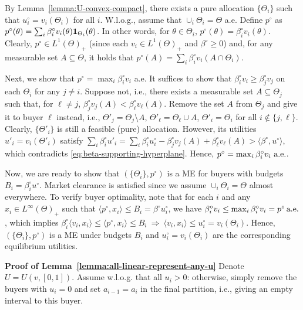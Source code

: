 	By Lemma~\ref{lemma:U-convex-compact}, there exists a pure allocation $\{\Theta_i\}$ such that $u^\circ_i = v_i(\Theta_i)$ for all $i$. W.l.o.g., assume that $\cup_i \Theta_i = \Theta$ a.e.
	Define $p^\circ$ as 
	$ p^\circ(\theta) = \sum_i \beta^\circ_i v_i(\theta)\mathbf{1}_{\Theta_i}(\theta)$. 
	In other words, for $\theta\in \Theta_i$, $p^\circ(\theta) = \beta^\circ_i v_i(\theta)$. Clearly, $p^\circ\in L^1(\Theta)_+$ (since each $v_i\in L^1(\Theta)_+$ and $\beta^\circ \geq 0$) and, for any measurable set $A\subseteq \Theta$, it holds that
	$ p^\circ(A) = \sum_i \beta^\circ_i v_i(A\cap \Theta_i)$.
	
	Next, we show that $p^\circ = \max_i \beta^\circ_i v_i$ a.e. It suffices to show that $\beta^\circ_i v_i \geq \beta^\circ_j v_j$ on each $\Theta_i$ for any $j\neq i$. Suppose not, i.e., there exists a measurable set $A\subseteq \Theta_j$ such that, for $\ell \neq j$,
	$ \beta^\circ_j v_j(A) < \beta^\circ_\ell v_\ell(A)$.
	Remove the set $A$ from $\Theta_j$ and give it to buyer $\ell$ instead, i.e., $\Theta'_j = \Theta_j \setminus A$, $\Theta'_\ell = \Theta_\ell \cup A$, $\Theta'_i = \Theta_i$ for all $i \notin \{j, \ell\}$. 
	Clearly, $\{\Theta'_i\}$ is still a feasible (pure) allocation. However, its utilities $u'_i = v_i(\Theta'_i)$ satisfy
	$ \sum_i \beta^\circ_i u'_i = \sum_i \beta^\circ_i u^\circ_i - \beta^\circ_j v_j(A) + \beta^\circ_\ell v_\ell(A) > \langle \beta^\circ, u^\circ\rangle$,
	which contradicts \eqref{eq:beta-supporting-hyperplane}. 
	Hence,
	$ p^\circ = \max_i \beta^\circ_i v_i \ \almeve$.
	
	Now, we are ready to show that $(\{\Theta_i\}, p^\circ)$ is a ME for buyers with budgets $B_i = \beta^\circ_i u^\circ$. Market clearance is satisfied since we assume $\cup_i \Theta_i = \Theta$ almost everywhere. 
	To verify buyer optimality, note that for each $i$ and any $x_i \in L^\infty(\Theta)_+$ such that $\langle p^\circ, x_i \rangle \leq B_i = \beta^\circ u^\circ_i$, we have 
	$ \beta^\circ_i v_i \leq \max_i \beta^\circ_i v_i = p^\circ \, \textnormal{a.e.}$,
	which implies
	$\beta^\circ_i \langle v_i, x_i \rangle \leq \langle p^\circ, x_i \rangle \leq B_i \ \Rightarrow \ \langle v_i, x_i \rangle \leq u^\circ_i = v_i(\Theta_i)$.
	Hence, $(\{\Theta_i\}, p^\circ)$ is a ME under budgets $B_i$ and $u^\circ_i = v_i(\Theta_i)$ are the corresponding equilibrium utilities.

	\smallskip\noindent\textbf{Proof of Lemma~\ref{lemma:all-linear-represent-any-u}}
	Denote $U = U(v, [0,1])$. 
	Assume w.l.o.g. that all $u_i > 0$: otherwise, simply remove the buyers with $u_i = 0$ and set $a_{i-1} = a_i$ in the final partition, i.e., giving an empty interval to this buyer.

